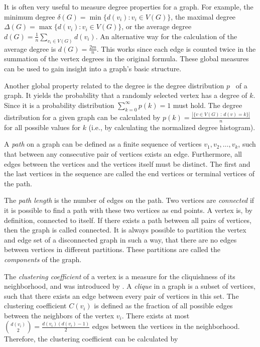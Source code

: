 It is often very useful to measure degree properties for a graph.
For example, the minimum degree \( \delta(G) = \min \{d(v_i) : v_i \in V(G)\} \), the maximal degree \( \Delta(G) = \max \{d(v_i) : v_i \in V(G)\} \), or the average degree \( d(G) = \frac{1}{n} \sum_{v_i \in V(G)} d(v_i) \).
An alternative way for the calculation of the average degree is \( d(G) = \frac{2m}{n} \).
This works since each edge is counted twice in the summation of the vertex degrees in the original formula.
These global measures can be used to gain insight into a graph's basic structure.

Another global property related to the degree is the degree distribution \( p \)~\cite{Barabasi2016} of a graph.
It yields the probability that a randomly selected vertex has a degree of \(k\).
Since it is a probability distribution \( \sum_{k=0}^\infty p(k) = 1 \) must hold.
The degree distribution for a given graph can be calculated by \( p(k) = \frac{|\{v \in V(G) \,:\, d(v) = k\}|}{n} \) for all possible values for \( k \) (i.e., by calculating the normalized degree histogram).

A \emph{path} on a graph can be defined as a finite sequence of vertices \( v_1,v_2,\dots,v_k \), such that between any consecutive pair of vertices exists an edge.
Furthermore, all edges between the vertices and the vertices itself must be distinct.
The first and the last vertices in the sequence are called the end vertices or terminal vertices of the path.

The \emph{path length} is the number of edges on the path.
Two vertices are \emph{connected} if it is possible to find a path with these two vertices as end points.
A vertex is, by definition, connected to itself.
If there exists a path between all pairs of vertices, then the graph is called connected.
It is always possible to partition the vertex and edge set of a disconnected graph in such a way, that there are no edges between vertices in different partitions.
These partitions are called the \emph{components} of the graph.

The \emph{clustering coefficient} of a vertex is a measure for the cliquishness of its neighborhood, and was introduced by \citet{Watts1998}.
A \emph{clique} in a graph is a subset of vertices, such that there exists an edge between every pair of vertices in this set.
The clustering coefficient \( C(v_i) \) is defined as the fraction of all possible edges between the neighbors of the vertex \( v_i \).
There exists at most \( \binom{d(v_i)}{2} = \frac{d(v_i)(d(v_i) - 1)}{2} \) edges between the vertices in the neighborhood.
Therefore, the clustering coefficient can be calculated by

